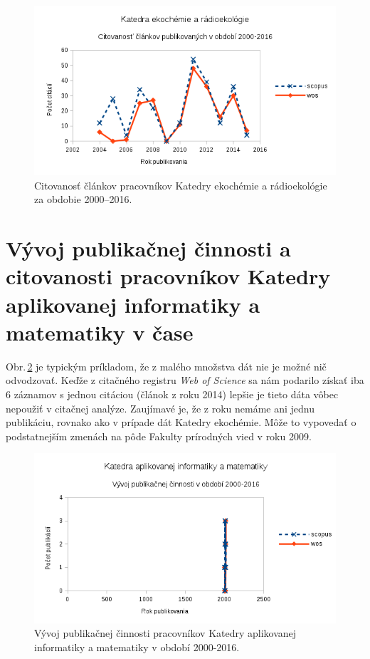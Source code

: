 \begin{figure}
  \centering
  \includegraphics[width=\textwidth]{obr/plot-eco-citations.png}
  \caption{Citovanosť článkov pracovníkov Katedry ekochémie a rádioekológie za obdobie 2000--2016.}
  \label{fig:plot.eco.citations}
\end{figure}


\section{Vývoj publikačnej činnosti a citovanosti pracovníkov Katedry aplikovanej informatiky a matematiky v čase}

Obr.\,\ref{fig:plot.inf.publications} je typickým príkladom, že z malého
množstva dát nie je možné nič odvodzovať. Keďže z citačného registru \emph{Web of
Science} sa nám podarilo získať iba 6 záznamov s jednou citáciou (článok z roku
2014) lepšie je tieto dáta vôbec nepoužiť v citačnej analýze. Zaujímavé je, že z
roku nemáme ani jednu publikáciu, rovnako ako v prípade dát Katedry
ekochémie. Môže to vypovedať o podstatnejším zmenách na pôde Fakulty prírodných
vied v roku 2009.

\begin{figure}
  \centering
  \includegraphics[width=\textwidth]{obr/plot-inf-publications.png}
  \caption{Vývoj publikačnej činnosti pracovníkov Katedry aplikovanej
    informatiky a matematiky v období 2000-2016.}
  \label{fig:plot.inf.publications}
\end{figure}

